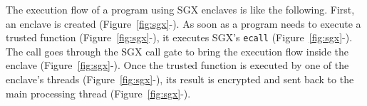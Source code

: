 The execution flow of a program using SGX enclaves is like the following.
First, an enclave is created (Figure~\ref{fig:sgx}-).
As soon as a program needs to execute a trusted function (Figure~\ref{fig:sgx}-), it executes SGX's \texttt{ecall} (Figure~\ref{fig:sgx}-).
The call goes through the SGX call gate to bring the execution flow inside the enclave (Figure~\ref{fig:sgx}-).
Once the trusted function is executed by one of the enclave's threads (Figure~\ref{fig:sgx}-), its result is encrypted and sent back to the main processing thread (Figure~\ref{fig:sgx}-).